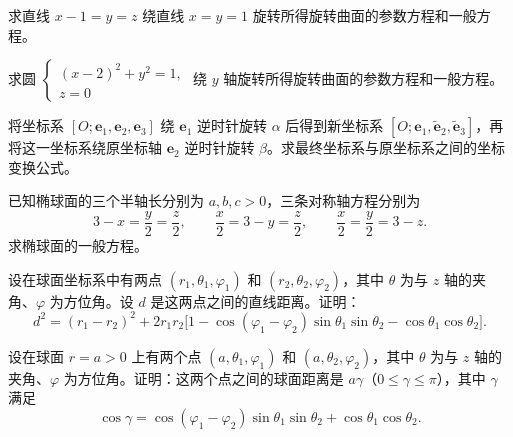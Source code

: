 \newpage
\noindent\begin{minipage}{\textwidth}
求直线 $x-1=y=z$ 绕直线 $x=y=1$ 旋转所得旋转曲面的参数方程和一般方程。
\end{minipage}\par\vfill
\noindent\begin{minipage}{\textwidth}
求圆 $\begin{cases}(x-2)^2+y^2=1,\\z=0\end{cases}$ 绕 $y$ 轴旋转所得旋转曲面的参数方程和一般方程。
\end{minipage}\par\vfill
\noindent\begin{minipage}{\textwidth}
将坐标系 $[O;\boldsymbol e_1,\boldsymbol e_2,\boldsymbol e_3]$ 绕 $\boldsymbol e_1$ 逆时针旋转 $\alpha$ 后得到新坐标系 $[O;\boldsymbol e_1,\widetilde{\boldsymbol e}_2,\widetilde{\boldsymbol e}_3]$，再将这一坐标系绕原坐标轴 $\boldsymbol e_2$ 逆时针旋转 $\beta$。求最终坐标系与原坐标系之间的坐标变换公式。
\end{minipage}\par\vfill
\noindent\begin{minipage}{\textwidth}
已知椭球面的三个半轴长分别为 $a,b,c>0$，三条对称轴方程分别为 \[3-x=\frac y2=\frac z2,\qquad \frac x2=3-y=\frac z2,\qquad \frac x2=\frac y2=3-z.\] 求椭球面的一般方程。
\end{minipage}\par\vfill
\newpage
\noindent\begin{minipage}{\textwidth}
设在球面坐标系中有两点 $(r_1,\theta_1,\varphi_1)$ 和 $(r_2,\theta_2,\varphi_2)$，其中 $\theta$ 为与 $z$ 轴的夹角、$\varphi$ 为方位角。设 $d$ 是这两点之间的直线距离。证明：\[d^2=(r_1-r_2)^2+2r_1r_2\bigl[1-\cos(\varphi_1-\varphi_2)\sin\theta_1\sin\theta_2-\cos\theta_1\cos\theta_2\bigr].\]
\end{minipage}\par\vfill
\noindent\begin{minipage}{\textwidth}
设在球面 $r=a>0$ 上有两个点 $(a,\theta_1,\varphi_1)$ 和 $(a,\theta_2,\varphi_2)$，其中 $\theta$ 为与 $z$ 轴的夹角、$\varphi$ 为方位角。证明：这两个点之间的球面距离是 $a\gamma$（$0\le\gamma\le\pi$），其中 $\gamma$ 满足 \[\cos\gamma=\cos(\varphi_1-\varphi_2)\sin\theta_1\sin\theta_2+\cos\theta_1\cos\theta_2.\]
\end{minipage}\par\vfill
